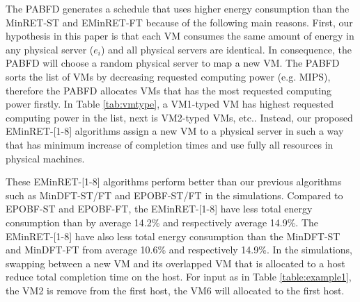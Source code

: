 The PABFD generates a schedule that uses higher energy consumption than
the MinRET-ST and EMinRET-FT because of the following main reasons.
First, our hypothesis in this paper is that each VM consumes the same amount of energy 
in any physical server ($e_{i}$) and all physical servers
are identical. In consequence, the PABFD will choose a random
physical server to map a new VM. The PABFD sorts the list of VMs by decreasing requested computing power (e.g. MIPS), 
 therefore the PABFD allocates VMs that has the most requested computing power firstly. 
 In Table \ref{tab:vmtype}, a VM1-typed VM has highest requested computing power in the list, next is VM2-typed VMs, etc..
Instead, our proposed EMinRET-[1-8] algorithms assign a new VM to a physical 
server in such a way that has minimum increase of completion times and use fully all resources in physical machines.

These EMinRET-[1-8] algorithms perform
better than our previous algorithms such as MinDFT-ST/FT and EPOBF-ST/FT in the simulations. 
Compared to EPOBF-ST and EPOBF-FT, the EMinRET-[1-8] have less
total energy consumption than by average 14.2\% and respectively average 14.9\%.
The EMinRET-[1-8] have also less
total energy consumption than the MinDFT-ST and MinDFT-FT from average 10.6\% and respectively 14.9\%.
In the simulations, swapping between a new VM and its overlapped VM that is allocated to a host 
 reduce total completion time on the host. 
 For input as in Table \ref{table:example1}, the VM2 is remove from the first host, 
 the VM6 will allocated to the first host.








